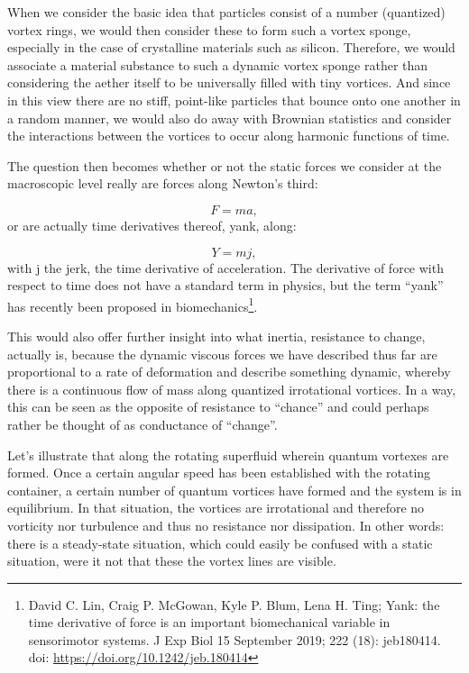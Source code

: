 \documentclass[a4paper]{article}
\newcommand\textstyleNone[1]{#1}
\begin{document}
{\color[rgb]{0.101960786,0.101960786,0.101960786}
\textstyleNone{When we consider the basic idea that particles consist of a number (quantized) vortex rings, we would
then consider these to form such a vortex sponge, especially in the case of crystalline materials such as silicon.
Therefore, we would associate a material substance to such a dynamic vortex sponge rather than considering the aether
itself to be universally filled with tiny vortices.  And since in this view there are no stiff, point-like particles
that bounce onto one another in a random manner, we would also do away with Brownian statistics and consider the
interactions between the vortices to occur along harmonic functions of time.}}

{\color[rgb]{0.101960786,0.101960786,0.101960786}
\textstyleNone{The question then becomes whether or not the static forces we consider at the macroscopic level really
are forces along Newton's third:}}

\begin{equation}
F=ma,
\end{equation}
{\color[rgb]{0.101960786,0.101960786,0.101960786}
\textstyleNone{or are actually time derivatives thereof, yank, along:}}

\begin{equation}
Y=mj,
\end{equation}
{\color[rgb]{0.101960786,0.101960786,0.101960786}
\textstyleNone{with j the jerk, the time derivative of acceleration. The derivative of force with respect to time does
not have a standard term in physics, but the term ``yank'' has recently been proposed in biomechanics}\footnote{ David
C. Lin, Craig P. McGowan, Kyle P. Blum, Lena H. Ting; Yank: the time derivative of force is an important biomechanical
variable in sensorimotor systems. J Exp Biol 15 September 2019; 222 (18): jeb180414. doi:
\url{https://doi.org/10.1242/jeb.180414} \par }\textstyleNone{.}}

\textstyleNone{{This would also offer further insight into what
inertia, resistance to {\textquotedbl}change{\textquotedbl},
}{actually
}{is, because the dynamic viscous forces we have described thus far
are proportional to a rate of
}{deformation}{
and describe }{something dynamic, whereby there is a continuous
flow of mass  along quantized }irrotational{ vortices. In a way,
this can be seen as the opposite of resistance to ``chance'' and could perhaps rather be thought of as conductance of
``change''.}}

{\color[rgb]{0.101960786,0.101960786,0.101960786}
\textstyleNone{Let's illustrate that along the rotating superfluid wherein quantum vortexes are formed. Once a certain
angular speed has been established with the rotating container, a certain number of quantum vortices have formed and
the system is in equilibrium. In that situation, the vortices are irrotational and therefore no vorticity nor
turbulence and thus no resistance nor dissipa}\textstyleNone{tion. In other words: there is a steady-state situation,
which could easily be confused with a {\textquotedbl}static{\textquotedbl} situation, were it not that these the vortex
lines are visible.}}
\end{document}
